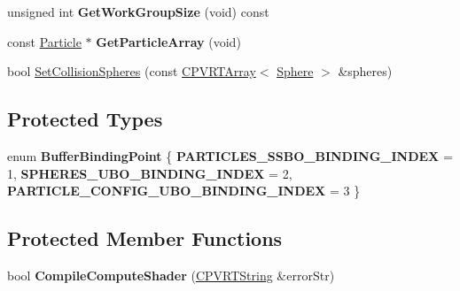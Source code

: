 \begin{DoxyCompactItemize}
\item 
\hypertarget{class_particle_system_g_p_u_ad3caf9bbab0930970d49ac6f1166769c}{unsigned int {\bfseries Get\+Work\+Group\+Size} (void) const }\label{class_particle_system_g_p_u_ad3caf9bbab0930970d49ac6f1166769c}

\item 
\hypertarget{class_particle_system_g_p_u_aec06f201ce607ac9f7a4aa595e05c7a8}{const \hyperlink{struct_particle}{Particle} $\ast$ {\bfseries Get\+Particle\+Array} (void)}\label{class_particle_system_g_p_u_aec06f201ce607ac9f7a4aa595e05c7a8}

\item 
bool \hyperlink{class_particle_system_g_p_u_af8ecc76c8d64ec34bca474b8a8d74d61}{Set\+Collision\+Spheres} (const \hyperlink{class_c_p_v_r_t_array}{C\+P\+V\+R\+T\+Array}$<$ \hyperlink{class_sphere}{Sphere} $>$ \&spheres)
\end{DoxyCompactItemize}
\subsection*{Protected Types}
\begin{DoxyCompactItemize}
\item 
\hypertarget{class_particle_system_g_p_u_a1516a7f92e21242ad7de24efe1f99efe}{enum {\bfseries Buffer\+Binding\+Point} \{ {\bfseries P\+A\+R\+T\+I\+C\+L\+E\+S\+\_\+\+S\+S\+B\+O\+\_\+\+B\+I\+N\+D\+I\+N\+G\+\_\+\+I\+N\+D\+E\+X} = 1, 
{\bfseries S\+P\+H\+E\+R\+E\+S\+\_\+\+U\+B\+O\+\_\+\+B\+I\+N\+D\+I\+N\+G\+\_\+\+I\+N\+D\+E\+X} = 2, 
{\bfseries P\+A\+R\+T\+I\+C\+L\+E\+\_\+\+C\+O\+N\+F\+I\+G\+\_\+\+U\+B\+O\+\_\+\+B\+I\+N\+D\+I\+N\+G\+\_\+\+I\+N\+D\+E\+X} = 3
 \}}\label{class_particle_system_g_p_u_a1516a7f92e21242ad7de24efe1f99efe}

\end{DoxyCompactItemize}
\subsection*{Protected Member Functions}
\begin{DoxyCompactItemize}
\item 
\hypertarget{class_particle_system_g_p_u_a934dbdd68af6de5c37e455267cf654ec}{bool {\bfseries Compile\+Compute\+Shader} (\hyperlink{class_c_p_v_r_t_string}{C\+P\+V\+R\+T\+String} \&error\+Str)}\label{class_particle_system_g_p_u_a934dbdd68af6de5c37e455267cf654ec}

\end{DoxyCompactItemize}
